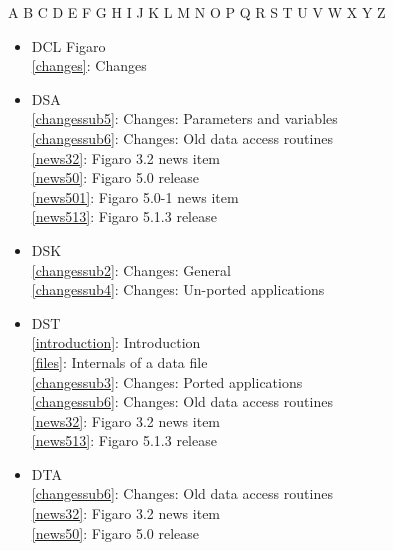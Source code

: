 \documentclass[11pt,twoside]{article}
\newcommand{\htmlref}[2]{#1}
\newcommand{\idxint}[2]{\ref{#1}: \htmlref{#2}{#1}}
\newcommand{\idxint}[2]{\htmlref{#2}{#1}}
\begin{document}
\begin{htmlonly}
\htmlref{A}{index_A}
\htmlref{B}{index_B}
\htmlref{C}{index_C}
D
\htmlref{E}{index_E}
\htmlref{F}{index_F}
\htmlref{G}{index_G}
\htmlref{H}{index_H}
\htmlref{I}{index_I}
\htmlref{J}{index_J}
\htmlref{K}{index_K}
\htmlref{L}{index_L}
\htmlref{M}{index_M}
\htmlref{N}{index_N}
\htmlref{O}{index_O}
\htmlref{P}{index_P}
\htmlref{Q}{index_Q}
\htmlref{R}{index_R}
\htmlref{S}{index_S}
\htmlref{T}{index_T}
\htmlref{U}{index_U}
\htmlref{V}{index_V}
\htmlref{W}{index_W}
\htmlref{X}{index_X}
\htmlref{Y}{index_Y}
Z
\end{htmlonly}

\begin{itemize}
\item DCL Figaro\\
   \idxint{changes}{Changes}
\item DSA\\
   \idxint{changessub5}{Changes: Parameters and variables}\\
   \idxint{changessub6}{Changes: Old data access routines}\\
   \idxint{news32}{Figaro 3.2 news item}\\
   \idxint{news50}{Figaro 5.0 release}\\
   \idxint{news501}{Figaro 5.0-1 news item}\\
   \idxint{news513}{Figaro 5.1.3 release}
\item DSK\\
   \idxint{changessub2}{Changes: General}\\
   \idxint{changessub4}{Changes: Un-ported applications}
\item DST\\
   \idxint{introduction}{Introduction}\\
   \idxint{files}{Internals of a data file}\\
   \idxint{changessub3}{Changes: Ported applications}\\
   \idxint{changessub6}{Changes: Old data access routines}\\
   \idxint{news32}{Figaro 3.2 news item}\\
   \idxint{news513}{Figaro 5.1.3 release}
\item DTA\\
   \idxint{changessub6}{Changes: Old data access routines}\\
   \idxint{news32}{Figaro 3.2 news item}\\
   \idxint{news50}{Figaro 5.0 release}\\

\end{itemize}
\end{document}
